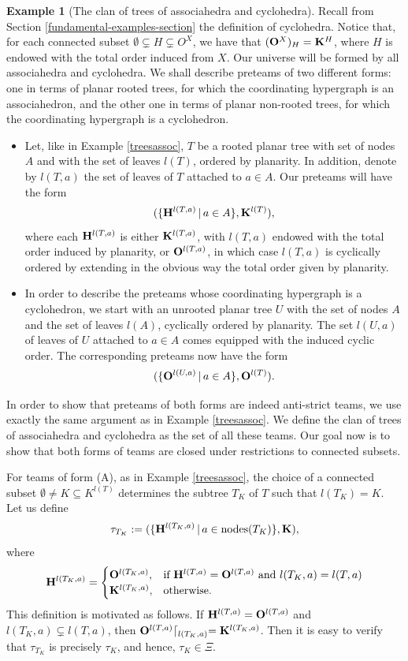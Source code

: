 \documentclass{article}
\theoremstyle{plain}
\theoremstyle{definition}
\newtheorem{example}[thm]{\sc Example}
\begin{document}
\begin{example}[The clan of trees of associahedra and cyclohedra]
\label{excyc} 
Recall from Section \ref{fundamental-examples-section} the definition of cyclohedra.
Notice that, for each connected subset $\emptyset \subsetneq H\subsetneq O^X$, we have that $({\bf O}^X)_H={\bf K}^H$, where $H$ is endowed with the total order induced from $X$. Our universe will be formed by  all associahedra and  cyclohedra. We shall describe preteams of two different forms: one in terms of planar rooted trees, for which the coordinating hypergraph is an associahedron, and the other one in terms of planar non-rooted trees,  for which the coordinating hypergraph is a cyclohedron. 
\begin{itemize}
\item[(A)] Let, like in Example \ref{treesassoc},  $T$ be a rooted planar tree with  set of nodes $A$ and with the set of leaves $l(T)$, ordered by planarity. In addition, denote by $l(T,a)$  the   set of leaves of $T$ attached to $a\in A$. Our preteams will have the form   $$(\{{\bf H}^{l(T,a)}\,|\,a\in A\}, {\bf K}^{l(T)}),$$ where each ${\bf H}^{l(T,a)}$ is either ${\bf K}^{l(T,a)}$, with ${l(T,a)}$  endowed with the total order induced by planarity, or  ${\bf O}^{l(T,a)}$, in which case $l(T,a)$  is cyclically ordered by extending in the obvious way the total order given by planarity. 

 

\item[(B)] In order to describe the preteams whose coordinating hypergraph is a cyclohedron, we start with an unrooted planar tree $U$ with the set of nodes $A$ and the set of leaves $l(A)$, cyclically ordered by planarity. The set $l(U,a)$ of leaves  of $U$ attached to $a\in A$ comes equipped with the induced cyclic order. The corresponding preteams now have the form $$(\{{\bf O}^{l(U,a)}\,|\,a\in A\}, {\bf O}^{l(T)}).$$  
\end{itemize}
In order to show that  preteams of both forms are indeed   anti-strict teams, we use exactly the same argument as in  Example \ref{treesassoc}. We define the clan of trees of associahedra and cyclohedra as the set of all these teams.    Our goal now is to show that both forms of teams are closed under restrictions to connected subsets.

 For teams of form (A), as in Example \ref{treesassoc}, the choice of a connected subset $\emptyset\neq K\subseteq K^{l(T)}$ determines the subtree $T_K$ of $T$ such that $l(T_K)=K$. Let us define $$\tau_{T_K}:=(\{{\bf H}^{l(T_K,a)}\,|\, a\in \mbox{nodes}(T_K)\},{\bf K}),$$ where
$${\bf H}^{l(T_K,a)}=\begin{cases}
{\bf O}^{l(T_K,a)},  & \mbox{if } {\bf H}^{l(T,a)}={\bf O}^{l(T,a)} \mbox{ and }   l(T_K,a)= l(T,a) \\
{\bf K}^{l(T_K,a)}, & \mbox{otherwise}.
\end{cases}$$
This definition is motivated as follows. If ${\bf H}^{l(T,a)}={\bf O}^{l(T,a)}$ and $l(T_K,a)\subsetneq l(T,a)$, then ${\bf O}^{l(T,a)}\lceil_{ l(T_K,a)}={\bf K}^{l(T_K,a)}$. Then it is easy to verify that $\tau_{T_K}$ is precisely $\tau_K$, and hence, $\tau_K\in \Xi$.


\end{example}
\end{document}

